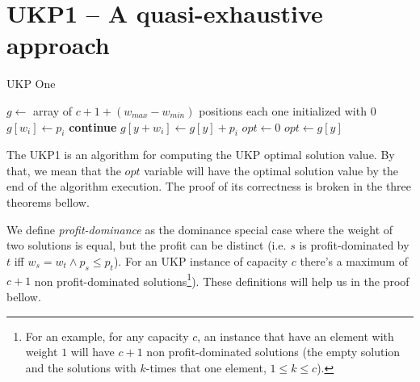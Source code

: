\documentclass[12pt]{article}
\begin{document}

\section{UKP1 -- A quasi-exhaustive approach}

\begin{algorithm}
\caption{UKP One}\label{alg:ukp1}
\begin{algorithmic}[1]
  \State \(g \gets\) array of \(c + 1 + (w_{max} - w_{min})\) positions each one initialized with \(0\)\label{ukp1:create_g}
  \State %
  \label{begin_trivial_bounds}
      \State \(g[w_i] \gets p_i\)
    \EndIf
  \EndFor\label{end_trivial_bounds}
  \State %
  \label{ukp1:main_ext_loop_begin}
    \label{ukp1:if_equal_to_zero}
    	\State \textbf{continue}
    \EndIf
    \State %
    \label{ukp1:main_inner_loop_begin}
      \label{ukp1:if_better_solution_begin}
        \State \(g[y + w_i] \gets g[y] + p_i\)
      \EndIf\label{ukp1:if_better_solution_end}
    \EndFor\label{ukp1:main_inner_loop_end}
  \EndFor\label{ukp1:main_ext_loop_end}
  \State %
  \State \(opt \gets 0\)
  \label{ukp1:get_opt_loop_begin}
    \label{ukp1:opt_loop_if}
      \State \(opt \gets g[y]\)
    \EndIf
  \EndFor\label{ukp1:get_opt_loop_end}
\EndProcedure
\end{algorithmic}
\end{algorithm}

The UKP1 is an algorithm for computing the UKP optimal solution value. By that, we mean that the \(opt\) variable will have the optimal solution value by the end of the algorithm execution. The proof of its correctness is broken in the three theorems bellow.

We define \textit{profit-dominance} as the dominance special case where the weight of two solutions is equal, but the profit can be distinct (i.e. \(s\) is profit-dominated by \(t\) iff \(w_s = w_t \land p_s \leq p_t\)). For an UKP instance of capacity \(c\) there's a maximum of \(c+1\) non profit-dominated solutions\footnote{For an example, for any capacity \(c\), an instance that have an element with weight \(1\) will have \(c+1\) non profit-dominated solutions (the empty solution and the solutions with \(k\)-times that one element, \(1 \leq k \leq c\)).}). These definitions will help us in the proof bellow.
\end{document}
